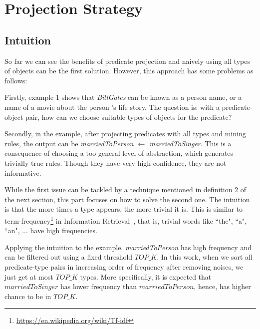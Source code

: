 \documentclass{acm_proc_article-sp}
\begin{document}
\section{Projection Strategy}

\subsection{Intuition}
\label{intuition}


So far we can see the benefits of predicate projection and naively using all types of objects can be the first solution. However, this approach has some problems as follows:

Firstly, example 1 shows that \textit{BillGates} can be known as a person name, or a name of a movie about the person 's life story. The question is: with a predicate-object pair, how can we choose suitable types of objects for the predicate?

Secondly, in the example, after projecting predicates with all types and mining rules, the output can be \textit{marriedToPerson $\leftarrow$ marriedToSinger}. This is a consequence of choosing a too general level of abstraction, which generates trivially true rules. Though they have very high confidence, they are not informative.

While the first issue can be tackled by a technique mentioned in definition 2 of the next section, this part focuses on how to solve the second one. The intuition is that the more times a type appears, the more trivial it is. This is similar to term-frequency\footnote{\url{https://en.wikipedia.org/wiki/Tf-idf}} in Information Retrieval~\cite{ref2}, that is, trivial words like ``the", ``a", ``an", ... have high frequencies.

Applying the intuition to the example, \textit{marriedToPerson} has high frequency and can be filtered out using a fixed threshold $TOP\_K$. In this work, when we sort all predicate-type pairs in increasing order of frequency after removing noises, we just get at most $TOP\_K$ types. More specifically, it is expected that $marriedToSinger$ has lower frequency than $marriedToPerson$, hence, has higher chance to be in $TOP\_K$.
\end{document}
